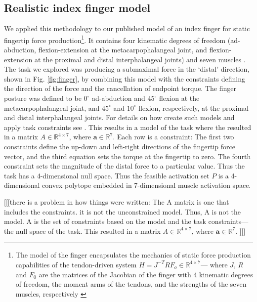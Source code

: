 \subsection*{Realistic index finger model}
\label{ss:finger}
We  applied this methodology to our published model of an index finger for static fingertip force production\footnote{The model of the finger encapsulates the mechanics of static force production capabilities of the tendon-driven system $H=J^{-T}RF_o \in \mathbb{R}^{4 \times 7}$--- where $J$, $R$ and $F_0$ are the matrices of the Jacobian of the finger with 4 kinematic degrees of freedom, the moment arms of the tendons, and the strengths of the seven muscles, respectively \cite{Valero-Cuevas1998Large,Valero-cuevas2015fundamentals}}. It contains  four kinematic degrees of freedom (ad-abduction, flexion-extension at the metacarpophalangeal joint, and flexion-extension at the proximal and distal interphalangeal joints) and seven muscles  \cite{Valero-Cuevas1998Large}. The task we explored was producing a submaximal force in the `distal'  direction, shown  in Fig. \ref{fig:finger}, by combining this model with the constraints defining the direction of the force and the cancellation of endpoint torque. The finger posture was defined to be $0^\circ$  ad-abduction and $45^\circ$ flexion at the metacarpophalangeal joint, and $45^\circ$ and $10^\circ$ flexion, respectively, at the proximal and distal interphalangeal joints. For details on how create such models and apply task constraints see \cite{Valero-Cuevas1998Large,valero-cuevas2015fundamentals}.  This results in a model of the task where the resulted in a matrix $A \in \mathbb{R}^{4 \times 7}$, where $\textbf{a} \in \mathbb{R}^7$. Each row is a constraint: The first two constraints define the up-down and  left-right directions of the fingertip force vector, and the third equation sets the torque at the fingertip to zero. The fourth constraint sets the magnitude of the distal force to a particular value. Thus the task has a 4-dimensional null space. Thus the feasible activation set $P$ is a 4-dimensional convex polytope embedded in 7-dimensional muscle activation space.

[[[there is a problem in how things were written: The A matrix is one that includes the constraints. it is not the unconstrained model. Thus, A is not the model. A is the  set of constraints based on the model and the task constraints---the null space of the task. This resulted in a matrix $A \in \mathbb{R}^{4 \times 7}$, where $\textbf{a} \in \mathbb{R}^7$. ]]]


